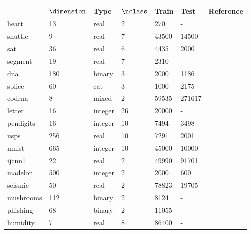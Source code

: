\begin{tabular}{|l|llllll|}
	\hline
	& $\dimension$ & Type & $\nclass$ & Train & Test & Reference \\\hline
	heart & 13 & real & 2 & 270 & - & {\small \citep{Lichman2013}}\\
	shuttle & 9 & real & 7 & 43500 & 14500 & {\small \citep{King_etal1995}}\\
	sat & 36 & real & 6 & 4435 & 2000 & {\small \citep{King_etal1995}}\\
	segment & 19 & real & 7 & 2310 & - & {\small \citep{King_etal1995}} \\
	dna & 180 & binary & 3 & 2000 & 1186 & {\small \citep{Michie_etal1994}}\\
	splice &  60 & cat & 3 & 1000 & 2175 & {\small \citep{Michie_etal1994}}\\
	codrna &  8 & mixed & 2 & 59535 & 271617 & {\small \citep{Uzilov_etal2006}}\\
	letter &  16 & integer & 26 & 20000 & - & {\small \citep{Frey_Slate1991}}\\
	pendigits & 16 & integer & 10 & 7494 & 3498 & {\small \citep{Alimoglu1996}}\\
	usps & 256 & real & 10 & 7291 & 2001 & {\small \citep{Hull1994}}\\
	mnist & 665 & integer & 10 & 45000 & 10000 & {\small \citep{LeCun_etal1998}}\\
	ijcnn1 & 22 & real & 2 & 49990 & 91701 & {\small \citep{Feldkamp_Puskorius1998}}\\
	madelon & 500 & integer & 2 & 2000 & 600 & {\small \citep{Guyon_etal2004}}\\
	seismic & 50 & real & 2 & 78823 & 19705 & {\small \citep{Duarte_Hu2004}}\\
	mushrooms & 112 & binary & 2 & 8124 & - & {\small \citep{Iba_etal1988}}\\
	phishing & 68 & binary & 2 & 11055 & - & {\small \citep{Mohommad_etal2014}}\\
	humidity & 7 & real & 8 & 86400 & - & {\small \citep{Mills2009}}\\
	\hline
\end{tabular}

